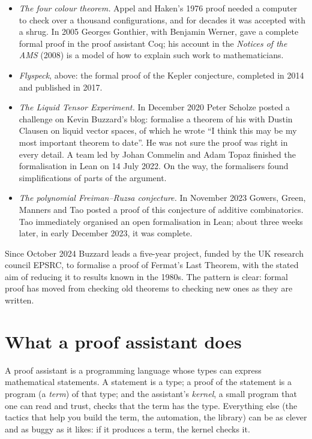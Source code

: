 \begin{itemize}
\item \emph{The four colour theorem.} Appel and Haken's 1976 proof needed a computer to check over a thousand configurations, and for decades it was accepted with a shrug. In 2005
Georges Gonthier, with Benjamin Werner, gave a complete formal proof in the proof assistant Coq; his account in the \emph{Notices of the AMS} (2008) is a model of how to explain
such work to mathematicians.
\item \emph{Flyspeck}, above: the formal proof of the Kepler conjecture, completed in 2014 and published in 2017.
\item \emph{The Liquid Tensor Experiment.} In December 2020 Peter Scholze posted a challenge on Kevin Buzzard's blog: formalise a theorem of his with Dustin Clausen on liquid
vector spaces, of which he wrote ``I think this may be my most important theorem to date''. He was not sure the proof was right in every detail. A team led by Johan Commelin and
Adam Topaz finished the formalisation in Lean on 14 July 2022. On the way, the formalisers found simplifications of parts of the argument.
\item \emph{The polynomial Freiman--Ruzsa conjecture.} In November 2023 Gowers, Green, Manners and Tao posted a proof of this conjecture of additive combinatorics. Tao immediately
organised an open formalisation in Lean; about three weeks later, in early December 2023, it was complete.
\end{itemize}

Since October 2024 Buzzard leads a five-year project, funded by the UK research council EPSRC, to formalise a proof of Fermat's Last Theorem, with the stated aim of reducing it to results
known in the 1980s. The pattern is clear: formal proof has moved from checking old theorems to checking new ones as they are written.

\section{What a proof assistant does}

A proof assistant is a programming language whose types can express mathematical statements. A statement is a type; a proof of the statement is a program (a \emph{term}) of that type;
and the assistant's \emph{kernel}, a small program that one can read and trust, checks that the term has the type. Everything else (the tactics that help you build the term, the
automation, the library) can be as clever and as buggy as it likes: if it produces a term, the kernel checks it.

